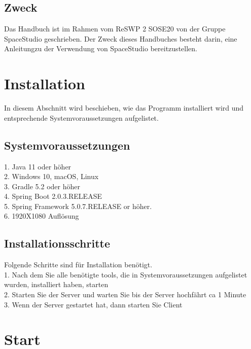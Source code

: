 \documentclass[fontsize=12pt,paper=a4,twoside]{scrartcl}
\begin{document}
\subsection{Zweck}

Das Handbuch ist im Rahmen vom ReSWP 2 SOSE20 von der Gruppe SpaceStudio geschrieben. Der Zweck dieses Handbuches besteht darin, eine Anleitungzu der Verwendung von SpaceStudio bereitzustellen.


\section{Installation}
In diesem Abschnitt wird beschieben, wie das Programm installiert wird und entsprechende Systemvoraussetzungen aufgelistet.

\subsection{Systemvoraussetzungen}
1. Java 11 oder höher \\
2. Windows 10, macOS, Linux \\
3. Gradle 5.2 oder höher \\
4. Spring Boot 2.0.3.RELEASE \\
5.  Spring Framework 5.0.7.RELEASE or höher. \\
6. 1920X1080 Auflösung
 

\subsection{Installationsschritte}
Folgende  Schritte sind für Installation benötigt. \\
1. Nach dem Sie alle benötigte tools, die in Systemvoraussetzungen aufgelistet wurden, installiert haben, starten \\
2. Starten Sie der Server und warten Sie bis der Server hochfährt ca 1 Minute\\
3. Wenn der Server gestartet hat, dann starten Sie Client

 



\section{Start}
\end{document}
